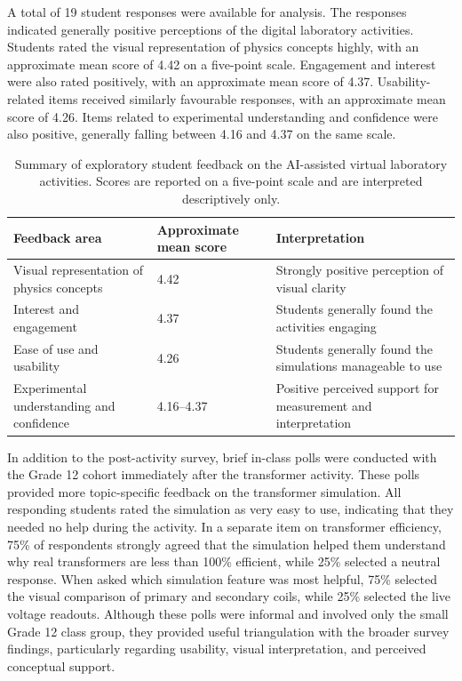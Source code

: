 \documentclass{iopjournal}
\begin{document}
A total of 19 student responses were available for analysis. The responses indicated generally positive perceptions of the digital laboratory activities. Students rated the visual representation of physics concepts highly, with an approximate mean score of 4.42 on a five-point scale. Engagement and interest were also rated positively, with an approximate mean score of 4.37. Usability-related items received similarly favourable responses, with an approximate mean score of 4.26. Items related to experimental understanding and confidence were also positive, generally falling between 4.16 and 4.37 on the same scale.

\begin{table}[htbp]
\caption{Summary of exploratory student feedback on the AI-assisted virtual laboratory activities. Scores are reported on a five-point scale and are interpreted descriptively only.}
\label{tab:student_feedback}
\centering
\begin{tabular}{p{5.5cm} p{3.0cm} p{4.5cm}}
\hline
\textbf{Feedback area} & \textbf{Approximate mean score} & \textbf{Interpretation} \\
\hline
Visual representation of physics concepts & 4.42 & Strongly positive perception of visual clarity \\
Interest and engagement & 4.37 & Students generally found the activities engaging \\
Ease of use and usability & 4.26 & Students generally found the simulations manageable to use \\
Experimental understanding and confidence & 4.16--4.37 & Positive perceived support for measurement and interpretation \\
\hline
\end{tabular}
\end{table}


In addition to the post-activity survey, brief in-class polls were conducted with the Grade 12 cohort immediately after the transformer activity. These polls provided more topic-specific feedback on the transformer simulation. All responding students rated the simulation as very easy to use, indicating that they needed no help during the activity. In a separate item on transformer efficiency, 75\% of respondents strongly agreed that the simulation helped them understand why real transformers are less than 100\% efficient, while 25\% selected a neutral response. When asked which simulation feature was most helpful, 75\% selected the visual comparison of primary and secondary coils, while 25\% selected the live voltage readouts. Although these polls were informal and involved only the small Grade 12 class group, they provided useful triangulation with the broader survey findings, particularly regarding usability, visual interpretation, and perceived conceptual support.
\end{document}
